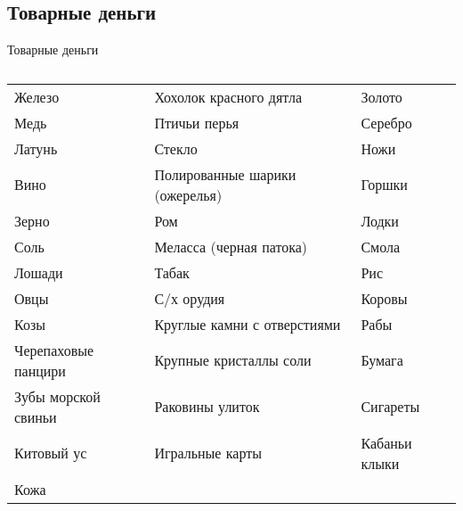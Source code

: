 \documentclass[_DKB_p1_Money.tex]{subfiles}
\begin{document}
\subsection{Товарные деньги}
\begin{frame}[shrink=20]{Товарные деньги}
\begin{table}[htbp]
  \centering
  \caption{}
\begin{tabularx}{\linewidth}[b]{@{}>{\raggedright\arraybackslash}XXX@{}}
	\toprule
	Железо              & Хохолок красного дятла         & Золото        \\
	Медь                & Птичьи перья                   & Серебро       \\
	Латунь              & Стекло                         & Ножи          \\
	Вино                & Полированные шарики (ожерелья) & Горшки        \\
	Зерно               & Ром                            & Лодки         \\
	Соль                & Меласса (черная патока)        & Смола         \\
	Лошади              & Табак                          & Рис           \\
	Овцы                & С/х орудия                     & Коровы        \\
	Козы                & Круглые камни с отверстиями    & Рабы          \\
	Черепаховые панцири & Крупные кристаллы соли         & Бумага        \\
	Зубы морской свиньи & Раковины улиток                & Сигареты      \\
	Китовый ус          & Игральные карты                & Кабаньи клыки \\
	Кожа                &                                &               \\ \bottomrule
\end{tabularx}%
  \label{tab:addlabel}%
\end{table}%
\end{frame}
\end{document}

